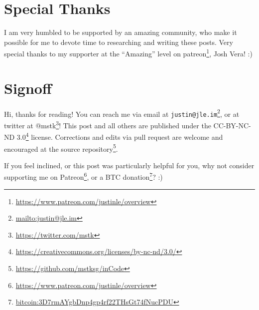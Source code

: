 \documentclass[]{article}
\renewcommand{\href}[2]{#2\footnote{\url{#1}}}
\begin{document}
\hypertarget{special-thanks}{%
\section{Special Thanks}\label{special-thanks}}

I am very humbled to be supported by an amazing community, who make it possible
for me to devote time to researching and writing these posts. Very special
thanks to my supporter at the ``Amazing'' level on
\href{https://www.patreon.com/justinle/overview}{patreon}, Josh Vera! :)

\hypertarget{signoff}{%
\section{Signoff}\label{signoff}}

Hi, thanks for reading! You can reach me via email at
\href{mailto:justin@jle.im}{\nolinkurl{justin@jle.im}}, or at twitter at
\href{https://twitter.com/mstk}{@mstk}! This post and all others are published
under the \href{https://creativecommons.org/licenses/by-nc-nd/3.0/}{CC-BY-NC-ND
3.0} license. Corrections and edits via pull request are welcome and encouraged
at \href{https://github.com/mstksg/inCode}{the source repository}.

If you feel inclined, or this post was particularly helpful for you, why not
consider \href{https://www.patreon.com/justinle/overview}{supporting me on
Patreon}, or a \href{bitcoin:3D7rmAYgbDnp4gp4rf22THsGt74fNucPDU}{BTC donation}?
:)
\end{document}
